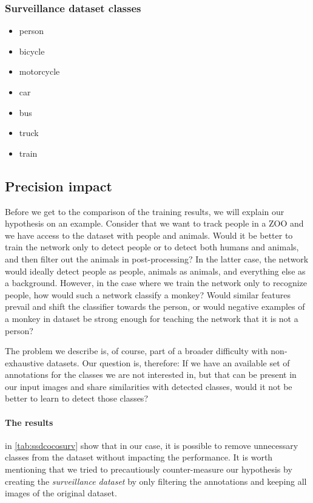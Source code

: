 \subsubsection{Surveillance dataset classes}
\begin{multicols}{2}
    \begin{itemize}
        \item person
        \item bicycle
        \item motorcycle
        \item car
        \item bus
        \item truck
        \item train
    \end{itemize}
\end{multicols}

\subsection{Precision impact}
Before we get to the comparison of the training results, we will explain our hypothesis on an example. Consider that we want to track people in a ZOO and we have access to the dataset with people and animals. Would it be better to train the network only to detect people or to detect both humans and animals, and then filter out the animals in post-processing? In the latter case, the network would ideally detect people as people, animals as animals, and everything else as a background. However, in the case where we train the network only to recognize people, how would such a network classify a monkey? Would similar features prevail and shift the classifier towards the person, or would negative examples of a monkey in dataset be strong enough for teaching the network that it is not a person? 

The problem we describe is, of course, part of a broader difficulty with non-exhaustive datasets. Our question is, therefore: If we have an available set of annotations for the classes we are not interested in, but that can be present in our input images and share similarities with detected classes, would it not be better to learn to detect those classes?

\paragraph{The results} in \cref{tab:ssdcocosurv} show that in our case, it is possible to remove unnecessary classes from the dataset without impacting the performance. It is worth mentioning that we tried to precautiously counter-measure our hypothesis by creating the \textit{surveillance dataset} by only filtering the annotations and keeping all images of the original dataset.


